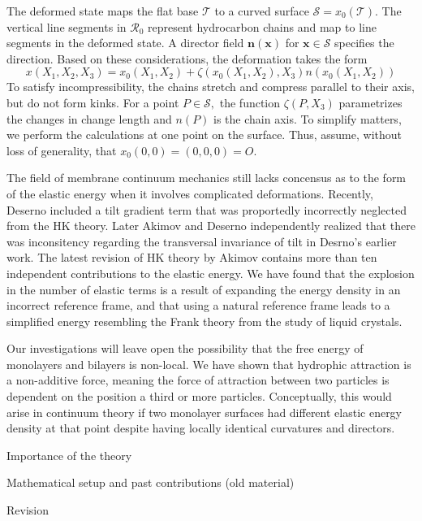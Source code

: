 The deformed state maps the flat base $\mathcal{T}$ to a curved surface $\mathcal{S} = x_0(\mathcal{T})$. 
The vertical line segments in $\mathcal{R}_0$ represent
hydrocarbon chains and map to line segments  in the deformed state.
A director field $\mathbf{n}(\mathbf{x})$ for $\mathbf{x} \in \mathcal{S}$ specifies the direction. 
Based on these considerations, the deformation takes the form  
\begin{equation}
x(X_1, X_2, X_3) = x_0(X_1, X_2) + \zeta(x_0(X_1, X_2), X_3) n(x_0(X_1, X_2))
\end{equation}    
To satisfy incompressibility, the chains stretch and compress parallel to their axis, but do not form kinks.
For a point $P \in \mathcal{S},$ the function $\zeta(P, X_3)$ parametrizes the changes in change length and 
$n(P)$ is the chain axis.  
To simplify matters, we perform the calculations at one point on the surface. 
Thus, assume, without loss of generality, that $x_0(0,0) = (0,0,0) = O$.

The field of membrane continuum mechanics still lacks concensus as to the form of the elastic energy when
it involves complicated deformations. Recently, Deserno included a tilt gradient term that was proportedly incorrectly neglected from the HK theory.
Later Akimov and Deserno independently realized that there was inconsitency regarding the transversal invariance
of tilt in Desrno's earlier work. The latest revision of HK theory by Akimov contains more than ten independent
contributions to the elastic energy. We have found that the explosion in the number of elastic terms
is a result of expanding the energy density in an incorrect reference frame, and that using a natural
reference frame leads to a simplified energy resembling the Frank theory from the study of liquid crystals. 

Our investigations will leave open the possibility that the free energy of monolayers and bilayers is non-local. 
We have shown that hydrophic attraction is a non-additive force, meaning the force of attraction between two
particles is dependent on the position a third or more particles. Conceptually, this would arise in continuum theory if two monolayer surfaces
had different elastic energy density at that point despite having locally identical curvatures and directors.



Importance of the theory

Mathematical setup and past contributions
(old material)

Revision 

